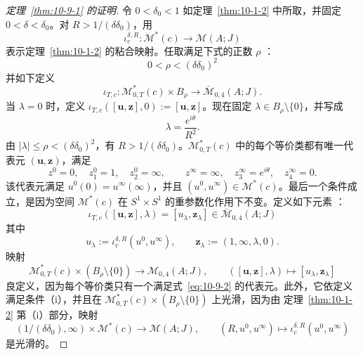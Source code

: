 \begin{proof}[定理~\ref{thm:10-9-1} 的证明]
令 $0<\delta_0<1$ 如定理~\ref{thm:10-1-2} 中所取，并固定
$0<\delta<\delta_0$。对 $R>1/(\delta\delta_0)$，用
\[
  \iota_c^{\delta,R}:\mathcal M^*(c)\longrightarrow\mathcal M(A;J)
\]
表示定理~\ref{thm:10-1-2} 的粘合映射。任取满足下式的正数 $\rho$
：
\[
  0<\rho<(\delta\delta_0)^2
\]
并如下定义
\[
  \iota_{T,c}:\mathcal M_{0,T}^*(c)\times B_\rho
  \longrightarrow\overline{\mathcal M}_{0,4}(A;J).
\]
当 $\lambda=0$ 时，定义
$\iota_{T,c}([\mathbf u,\mathbf z],0):=[\mathbf u,\mathbf z]$。现在固定
$\lambda\in B_\rho\setminus\{0\}$，并写成
\[
  \lambda=\frac{e^{i\theta}}{R^2}.
\]
由 $|\lambda|\leq\rho<(\delta\delta_0)^2$，有
$R>1/(\delta\delta_0)$。$\mathcal M_{0,T}^*(c)$ 中的每个等价类都有唯一代表元
$(\mathbf u,\mathbf z)$，满足
\begin{equation}\label{eq:10-9-2}
  z^0=0,\quad z_1^0=1,\quad z_2^0=\infty,\qquad
  z^\infty=\infty,\quad z_3^\infty=e^{i\theta},\quad z_4^\infty=0.
\end{equation}
该代表元满足 $u^0(0)=u^\infty(\infty)$，并且
$(u^0,u^\infty)\in\mathcal M^*(c)$。最后一个条件成立，是因为空间
$\mathcal M^*(c)$ 在 $S^1\times S^1$ 的重参数化作用下不变。定义如下元素
：
\[
  \iota_{T,c}([\mathbf u,\mathbf z],\lambda)
  =[u_\lambda,\mathbf z_\lambda]
  \in\overline{\mathcal M}_{0,4}(A;J)
\]
其中
\[
  u_\lambda:=\iota_c^{\delta,R}(u^0,u^\infty),
  \qquad \mathbf z_\lambda:=(1,\infty,\lambda,0).
\]
映射
\[
  \mathcal M_{0,T}^*(c)\times(B_\rho\setminus\{0\})
  \longrightarrow\mathcal M_{0,4}(A;J),
  \qquad ([\mathbf u,\mathbf z],\lambda)\longmapsto
  [u_\lambda,\mathbf z_\lambda]
\]
良定义，因为每个等价类只有一个满足式~\eqref{eq:10-9-2} 的代表元。此外，它依定义
满足条件（i），并且在
$\mathcal M_{0,T}^*(c)\times(B_\rho\setminus\{0\})$ 上光滑，因为由
定理~\ref{thm:10-1-2} 第（i）部分，映射
\[
  (1/(\delta\delta_0),\infty)\times\mathcal M^*(c)
  \longrightarrow\mathcal M(A;J),
  \qquad(R,u^0,u^\infty)\longmapsto
  \iota_c^{\delta,R}(u^0,u^\infty)
\]
是光滑的。


\end{proof}
